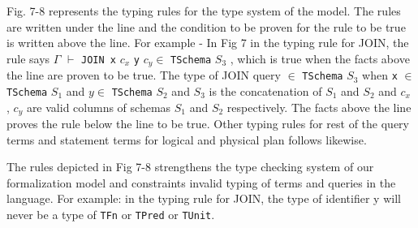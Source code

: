 Fig. 7-8 represents the typing rules for the type system of the model. The rules are written under the line and the condition to be proven for the rule to be true is written above the line. For example - In Fig 7 in the typing rule for JOIN, the rule says \newline $\Gamma$ $\vdash$ \texttt{JOIN \:x} \:$c_x$ \texttt{\:y} \:$c_y \in$ \texttt{TSchema} \:$S_3$ ,\: which is true when the facts above the line are proven to be true. The type of JOIN query $\in$ \texttt{TSchema} \:$S_3$ when \texttt{x} $\in$ \: \texttt{TSchema} \:$S_1$ and $y \in$ \: \texttt{TSchema} \:$S_2$ and $S_3$ is the concatenation of $S_1$ and $S_2$ and $c_x$ , $c_y$ are valid columns of schemas $S_1$ and $S_2$ respectively. The facts above the line proves the rule below the line to be true. Other typing rules for rest of the query terms and statement terms for logical and physical plan follows likewise.

The rules depicted in Fig 7-8 strengthens the type checking system of our formalization model and constraints invalid typing of terms and queries in the language. For example: in the typing rule for JOIN, the type of identifier y will never be a type of \texttt{TFn} or \texttt{TPred} or \texttt{TUnit}.
